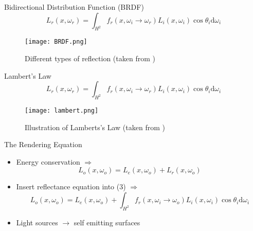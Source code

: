\begin{frame}{Bidirectional Distribution Function (BRDF)}
\begin{equation*}
L_r(x, \omega_r) = \int_{H^2} f_r(x, \omega_i \rightarrow \omega_r) L_i(x, \omega_i) \cos \theta_i \mathrm{d}\omega_i
\end{equation*}
\begin{center}
\begin{figure}
\texttt{[image: BRDF.png]}
\caption{Different types of reflection (taken from \cite{Bungartz.2014})}
\end{figure}
\end{center}
\end{frame}

\begin{frame}{Lambert's Law}
\begin{equation*}
L_r(x, \omega_r) = \int_{H^2} f_r(x, \omega_i \rightarrow \omega_r) L_i(x, \omega_i) \cos \theta_i \mathrm{d}\omega_i
\end{equation*}
\begin{center}
\begin{figure}
    \texttt{[image: lambert.png]}
    \caption{Illustration of Lamberts's Law (taken from \cite{Pharr.2023})}
\end{figure}
\end{center}
\end{frame}

\begin{frame}{The Rendering Equation}
\begin{itemize}
\pause
\item Energy conservation $\Rightarrow$
\begin{equation}
L_o(x, \omega_o) =  L_e(x, \omega_o) +  L_r(x, \omega_o)
\end{equation}
\pause
\item Insert reflectance equation into (3) $\Rightarrow$
\begin{equation} L_o(x, \omega_o) =  L_e(x, \omega_o) + \int_{H^2} f_r(x, \omega_i \rightarrow \omega_o) L_i(x, \omega_i) \cos \theta_i \mathrm{d}\omega_i 
\end{equation}
\pause
\item Light sources  $\rightarrow$ self emitting surfaces
\end{itemize}
\end{frame}


